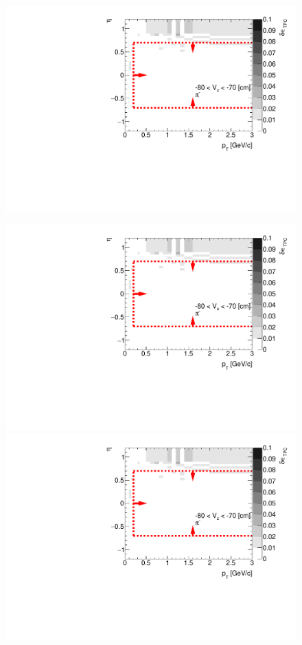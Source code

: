 \begin{figure}[hb]
{		\includegraphics[width=\linewidth,page=11]{graphics/systematicsEfficiency/deadMaterial/secondaries_Unbinned_SDCD_.pdf}
	}%
	\parbox{0.325\textwidth}{
		\centering
		\includegraphics[width=\linewidth,page=3]{graphics/systematicsEfficiency/deadMaterial/secondaries_Unbinned_SDCD_.pdf}\\
		\includegraphics[width=\linewidth,page=6]{graphics/systematicsEfficiency/deadMaterial/secondaries_Unbinned_SDCD_.pdf}\\
}
\end{figure}
